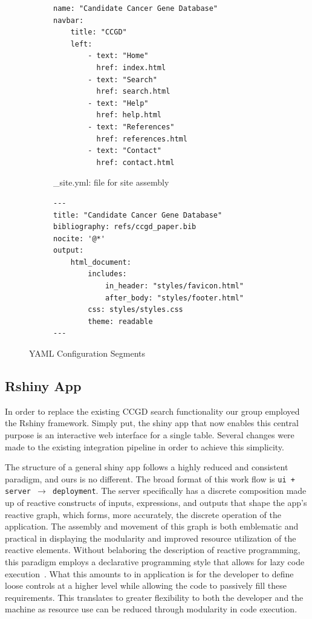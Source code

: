 \documentclass[10pt]{report}
\begin{document}
\begin{figure}
\centering
    \addtolength\tabcolsep{-0.2em}
\begin{subfigure}[b]{.5\linewidth}
    \centering
\begin{verbatim}
name: "Candidate Cancer Gene Database"
navbar:
    title: "CCGD"
    left:
        - text: "Home"
          href: index.html
        - text: "Search"
          href: search.html
        - text: "Help"
          href: help.html
        - text: "References"
          href: references.html
        - text: "Contact"
          href: contact.html
\end{verbatim}
\caption{\_site.yml: file for site assembly}\label{fig:siteYaml}
\end{subfigure}%
\begin{subfigure}[b]{.5\textwidth}
\centering
\begin{verbatim}
---
title: "Candidate Cancer Gene Database"
bibliography: refs/ccgd_paper.bib
nocite: '@*'
output:
    html_document:
        includes:
            in_header: "styles/favicon.html"
            after_body: "styles/footer.html"
        css: styles/styles.css
        theme: readable
---
\end{verbatim}
\label{fig:pageHeader}
\end{subfigure}
\caption{YAML Configuration Segments}\label{fig:yamls}
    \addtolength\tabcolsep{+0.2em}
\end{figure}



\subsection{Rshiny App}
In order to replace the existing CCGD search functionality our group employed the Rshiny framework. Simply put, the shiny app that now enables this central purpose is an interactive web interface for a single table. Several changes were made to the existing integration pipeline in order to achieve this simplicity.

The structure of a general shiny app follows a highly reduced and consistent paradigm, and ours is no different. The broad format of this work flow is \texttt{ui + server $\rightarrow$ deployment}. The server specifically has a discrete composition made up of reactive constructs of inputs, expressions, and outputs that shape the app's reactive graph, which forms, more accurately, the discrete operation of the application. The assembly and movement of this graph is both emblematic and practical in displaying the modularity and improved resource utilization of the reactive elements. Without belaboring the description of reactive programming, this paradigm employs a declarative programming style that allows for lazy code execution~\cite{Wickham}. What this amounts to in application is for the developer to define loose controls at a higher level while allowing the code to passively fill these requirements. This translates to greater flexibility to both the developer and the machine as resource use can be reduced through modularity in code execution.
\end{document}

